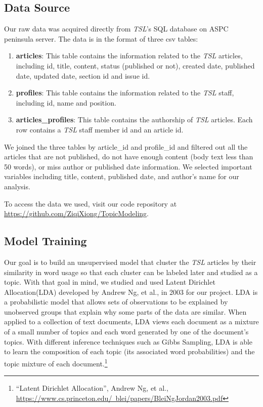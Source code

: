\documentclass[a4paper]{article}
\begin{document}
\subsection{Data Source}

Our raw data was acquired directly from \textit{TSL}'s SQL database on ASPC peninsula server. The data is in the format of three csv tables: 

\begin{enumerate}
\item \textbf{articles}: This table contains the information related to the \textit{TSL} articles, including id, title, content, status (published or not), created date, published date, updated date, section id and issue id.
\item \textbf{profiles}: This table contains the information related to the \textit{TSL} staff, including id, name and position.
\item \textbf{articles\_profiles}: This table contains the authorship of \textit{TSL} articles. Each row contains a \textit{TSL} staff member id and an article id.
\end{enumerate}

We joined the three tables by article\_id and profile\_id and filtered out all the articles that are not published, do not have enough content (body text less than 50 words), or miss author or published date information. We selected important variables including title, content, published date, and author's name for our analysis.

To access the data we used, visit our code repository at \href{https://github.com/ZiqiXiong/TopicModeling}{https://github.com/ZiqiXiong/TopicModeling}.

\subsection{Model Training}

Our goal is to build an unsupervised model that cluster the \textit{TSL} articles by their similarity in word usage so that each cluster can be labeled later and studied as a topic. With that goal in mind, we studied and used Latent Dirichlet Allocation(LDA) developed by Andrew Ng, et al., in 2003 for our project. LDA is a probabilistic model that allows sets of observations to be explained by unobserved groups that explain why some parts of the data are similar. When applied to a collection of text documents, LDA views each document as a mixture of a small number of topics and each word generated by one of the document's topics. With different inference techniques such as Gibbs Sampling, LDA is able to learn the composition of each topic (its associated word probabilities) and the topic mixture of each document.\footnote{``Latent Dirichlet Allocation'', Andrew Ng, et al., \href{https://www.cs.princeton.edu/~blei/papers/BleiNgJordan2003.pdf}{https://www.cs.princeton.edu/~blei/papers/BleiNgJordan2003.pdf}}
\end{document}
